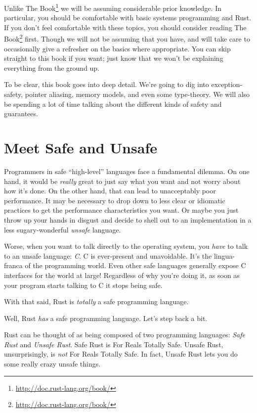 \documentclass[a4paper,]{book}
\renewcommand{\href}[2]{#2\footnote{\url{#1}}}
\begin{document}
Unlike \href{http://doc.rust-lang.org/book/}{The Book} we will be
assuming considerable prior knowledge. In particular, you should be
comfortable with basic systems programming and Rust. If you don't feel
comfortable with these topics, you should consider
\href{http://doc.rust-lang.org/book/}{reading The Book} first. Though we
will not be assuming that you have, and will take care to occasionally
give a refresher on the basics where appropriate. You can skip straight
to this book if you want; just know that we won't be explaining
everything from the ground up.

To be clear, this book goes into deep detail. We're going to dig into
exception-safety, pointer aliasing, memory models, and even some
type-theory. We will also be spending a lot of time talking about the
different kinds of safety and guarantees.

\chapter{Meet Safe and Unsafe}\label{sec--meet-safe-and-unsafe}

Programmers in safe ``high-level'' languages face a fundamental dilemma.
On one hand, it would be \emph{really} great to just say what you want
and not worry about how it's done. On the other hand, that can lead to
unacceptably poor performance. It may be necessary to drop down to less
clear or idiomatic practices to get the performance characteristics you
want. Or maybe you just throw up your hands in disgust and decide to
shell out to an implementation in a less sugary-wonderful \emph{unsafe}
language.

Worse, when you want to talk directly to the operating system, you
\emph{have} to talk to an unsafe language: \emph{C}. C is ever-present
and unavoidable. It's the lingua-franca of the programming world. Even
other safe languages generally expose C interfaces for the world at
large! Regardless of why you're doing it, as soon as your program starts
talking to C it stops being safe.

With that said, Rust is \emph{totally} a safe programming language.

Well, Rust \emph{has} a safe programming language. Let's step back a
bit.

Rust can be thought of as being composed of two programming languages:
\emph{Safe Rust} and \emph{Unsafe Rust}. Safe Rust is For Reals Totally
Safe. Unsafe Rust, unsurprisingly, is \emph{not} For Reals Totally Safe.
In fact, Unsafe Rust lets you do some really crazy unsafe things.
\end{document}
